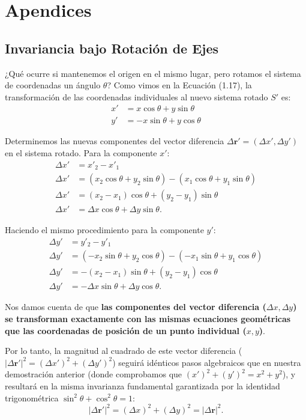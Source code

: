 \documentclass[11pt,a4paper]{book}
\begin{document}
\appendix


\chapter{Apendices}

\section{Invariancia bajo Rotación de Ejes}

¿Qué ocurre si mantenemos el origen en el mismo lugar, pero rotamos el sistema de coordenadas un ángulo $\theta$?
Como vimos en la Ecuación (1.17), la transformación de las coordenadas individuales al nuevo sistema rotado $S'$ es:
\begin{align}
    x' &= x \cos\theta + y \sin\theta \\
    y' &= -x \sin\theta + y \cos\theta
\end{align}

Determinemos las nuevas componentes del vector diferencia $\Delta\boldsymbol{r}' = (\Delta x', \Delta y')$ en el sistema rotado.
Para la componente $x'$:
\begin{align*}
    \Delta x' &= x'_2 - x'_1 \\
    \Delta x' &= (x_2 \cos\theta + y_2 \sin\theta) - (x_1 \cos\theta + y_1 \sin\theta) \\
    \Delta x' &= (x_2 - x_1) \cos\theta + (y_2 - y_1) \sin\theta \\
    \Delta x' &= \Delta x \cos\theta + \Delta y \sin\theta.
\end{align*}

Haciendo el mismo procedimiento para la componente $y'$:
\begin{align*}
    \Delta y' &= y'_2 - y'_1 \\
    \Delta y' &= (-x_2 \sin\theta + y_2 \cos\theta) - (-x_1 \sin\theta + y_1 \cos\theta) \\
    \Delta y' &= -(x_2 - x_1) \sin\theta + (y_2 - y_1) \cos\theta \\
    \Delta y' &= -\Delta x \sin\theta + \Delta y \cos\theta.
\end{align*}

Nos damos cuenta de que \textbf{las componentes del vector diferencia ($\Delta x, \Delta y$) se transforman exactamente con las mismas ecuaciones geométricas que las coordenadas de posición de un punto individual ($x, y$)}. 

Por lo tanto, la magnitud al cuadrado de este vector diferencia ($|\Delta\boldsymbol{r}'|^2 = (\Delta x')^2 + (\Delta y')^2$) seguirá idénticos pasos algebraicos que en nuestra demostración anterior (donde comprobamos que $(x')^2 + (y')^2 = x^2 + y^2$), y resultará en la misma invarianza fundamental garantizada por la identidad trigonométrica $\sin^2\theta + \cos^2\theta = 1$:
\begin{equation}
    |\Delta\boldsymbol{r}'|^2 = (\Delta x)^2 + (\Delta y)^2 = |\Delta\boldsymbol{r}|^2.
\end{equation}
\end{document}
